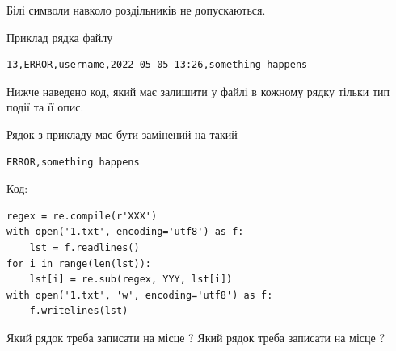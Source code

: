 \documentclass[12pt, ukrainian]{article}
\begin{document}
{Білі символи навколо роздільників не допускаються.

Приклад рядка файлу



\begin{verbatim}
13,ERROR,username,2022-05-05 13:26,something happens
\end{verbatim}


Нижче наведено код, який має залишити у файлі в кожному рядку тільки тип події та її опис.

Рядок з прикладу має бути замінений на такий



\begin{verbatim}
ERROR,something happens
\end{verbatim}




Код:



\begin{verbatim}
regex = re.compile(r'XXX')
with open('1.txt', encoding='utf8') as f:
    lst = f.readlines()
for i in range(len(lst)):
    lst[i] = re.sub(regex, YYY, lst[i])
with open('1.txt', 'w', encoding='utf8') as f:
    f.writelines(lst)
\end{verbatim}







Який рядок треба записати на місце  ?
Який рядок треба записати на місце  ?\par

}
\newpage
\end{document}
